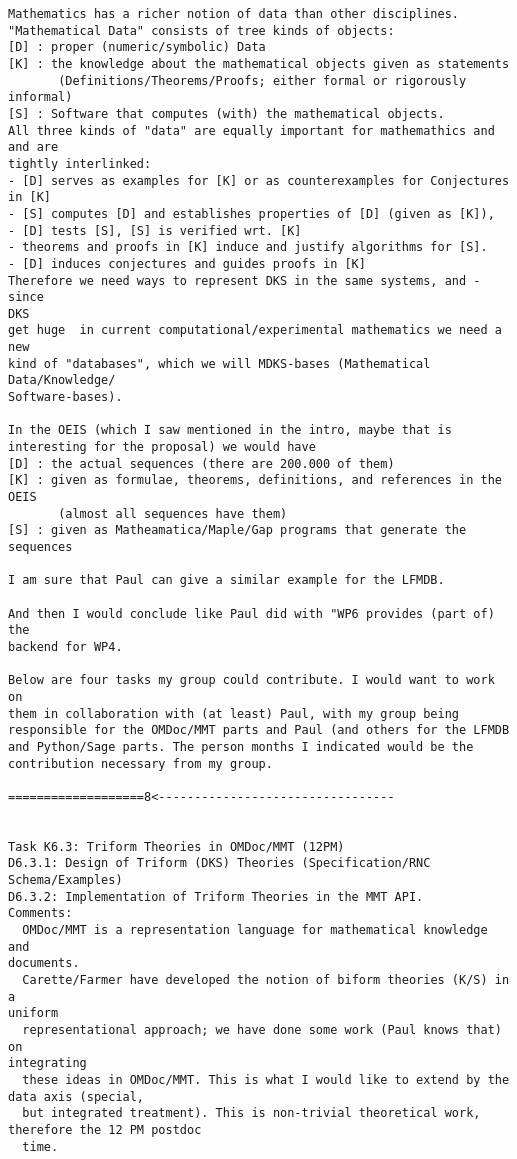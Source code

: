 \begin{Workpackage}{\thewpno}
\begin{verbatim}
Mathematics has a richer notion of data than other disciplines.
"Mathematical Data" consists of tree kinds of objects:
[D] : proper (numeric/symbolic) Data
[K] : the knowledge about the mathematical objects given as statements
       (Definitions/Theorems/Proofs; either formal or rigorously informal)
[S] : Software that computes (with) the mathematical objects.
All three kinds of "data" are equally important for mathemathics and and are
tightly interlinked:
- [D] serves as examples for [K] or as counterexamples for Conjectures
in [K]
- [S] computes [D] and establishes properties of [D] (given as [K]),
- [D] tests [S], [S] is verified wrt. [K]
- theorems and proofs in [K] induce and justify algorithms for [S].
- [D] induces conjectures and guides proofs in [K]
Therefore we need ways to represent DKS in the same systems, and - since
DKS
get huge  in current computational/experimental mathematics we need a new
kind of "databases", which we will MDKS-bases (Mathematical Data/Knowledge/
Software-bases).

In the OEIS (which I saw mentioned in the intro, maybe that is
interesting for the proposal) we would have
[D] : the actual sequences (there are 200.000 of them)
[K] : given as formulae, theorems, definitions, and references in the OEIS
       (almost all sequences have them)
[S] : given as Matheamatica/Maple/Gap programs that generate the sequences

I am sure that Paul can give a similar example for the LFMDB.

And then I would conclude like Paul did with "WP6 provides (part of) the
backend for WP4.

Below are four tasks my group could contribute. I would want to work on
them in collaboration with (at least) Paul, with my group being
responsible for the OMDoc/MMT parts and Paul (and others for the LFMDB
and Python/Sage parts. The person months I indicated would be the
contribution necessary from my group.

===================8<---------------------------------


Task K6.3: Triform Theories in OMDoc/MMT (12PM)
D6.3.1: Design of Triform (DKS) Theories (Specification/RNC Schema/Examples)
D6.3.2: Implementation of Triform Theories in the MMT API.
Comments:
  OMDoc/MMT is a representation language for mathematical knowledge and
documents.
  Carette/Farmer have developed the notion of biform theories (K/S) in a
uniform
  representational approach; we have done some work (Paul knows that) on
integrating
  these ideas in OMDoc/MMT. This is what I would like to extend by the
data axis (special,
  but integrated treatment). This is non-trivial theoretical work,
therefore the 12 PM postdoc
  time.


\end{verbatim}
\end{Workpackage}
